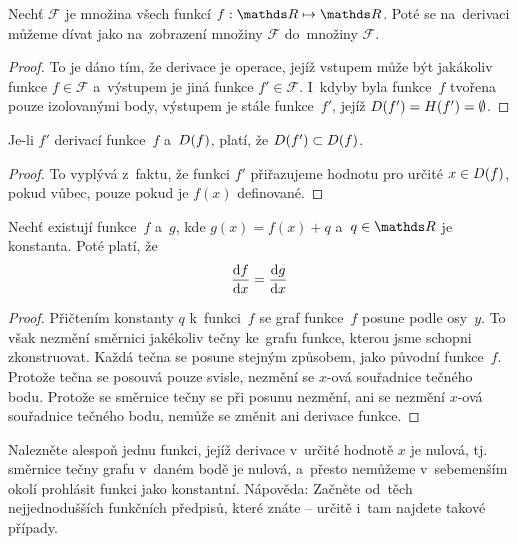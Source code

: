 \begin{lemma}
    Nechť $\mathcal{F}$ je množina všech funkcí ${f: \reals \mapsto \reals}$. Poté se
    na~derivaci můžeme dívat jako na~zobrazení množiny $\mathcal{F}$ do~množiny
    $\mathcal{F}$.

    \begin{proof}
        To je dáno tím, že derivace je operace, jejíž vstupem může být jakákoliv
        funkce ${f \in \mathcal{F}}$ a~výstupem je jiná funkce ${f' \in \mathcal{F}}$.
        I~kdyby byla funkce~$f$ tvořena pouze izolovanými body, výstupem je stále
        funkce~$f'$, jejíž ${D(f') = H(f') = \emptyset}$.
    \end{proof}
\end{lemma}

\begin{lemma}
    Je-li $f'$ derivací funkce~$f$ a~$D(f)$, platí, že
    ${D(f') \subset D(f)}$.

    \begin{proof}
        To vyplývá z~faktu, že funkci $f'$ přiřazujeme hodnotu pro určité
        ${x \in D(f)}$, pokud vůbec, pouze pokud je $f(x)$ definované.
    \end{proof}
\end{lemma}

\begin{lemma}
    Nechť existují funkce~$f$ a~$g$, kde ${g(x) = f(x) + q}$
    a~${q \in \reals}$ je konstanta. Poté platí, že
    \begin{equation*}
        \frac{\mathrm{d} f}{\mathrm{d} x} = \frac{\mathrm{d} g}{\mathrm{d} x}
    \end{equation*}

    \begin{proof}
        Přičtením konstanty $q$ k~funkci~$f$ se graf funkce~$f$ posune podle
        osy~$y$. To však nezmění směrnici jakékoliv tečny ke~grafu funkce, kterou
        jsme schopni zkonstruovat. Každá tečna se posune stejným způsobem, jako
        původní funkce~$f$. Protože tečna se posouvá pouze svisle, nezmění se
        $x$-ová souřadnice tečného bodu. Protože se směrnice tečny se při posunu
        nezmění, ani se nezmění $x$-ová souřadnice tečného bodu, nemůže se změnit
        ani derivace funkce.
    \end{proof}
\end{lemma}

\begin{exercise}
    Nalezněte alespoň jednu funkci, jejíž derivace v~určité hodnotě $x$ je nulová,
    tj. směrnice tečny grafu v~daném bodě je nulová, a~přesto nemůžeme v~sebemenším
    okolí prohlásit funkci jako konstantní. Nápověda: Začněte od~těch nejjednodušších
    funkčních předpisů, které znáte -- určitě i~tam najdete takové případy.
\end{exercise}

